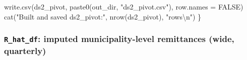 \documentclass[
  11pt,
  letterpaper,
  DIV=11,
  numbers=noendperiod]{scrartcl}
\newenvironment{Shaded}{}{}
\newcommand{\AttributeTok}[1]{\textcolor[rgb]{0.84,0.23,0.29}{#1}}
\newcommand{\ConstantTok}[1]{\textcolor[rgb]{0.00,0.36,0.77}{#1}}
\newcommand{\FunctionTok}[1]{\textcolor[rgb]{0.44,0.26,0.76}{#1}}
\newcommand{\NormalTok}[1]{\textcolor[rgb]{0.14,0.16,0.18}{#1}}
\newcommand{\SpecialCharTok}[1]{\textcolor[rgb]{0.00,0.36,0.77}{#1}}
\newcommand{\StringTok}[1]{\textcolor[rgb]{0.01,0.18,0.38}{#1}}
\begin{document}
\begin{Shaded}
\begin{Highlighting}[]
  \FunctionTok{write.csv}\NormalTok{(ds2\_pivot, }\FunctionTok{paste0}\NormalTok{(out\_dir, }\StringTok{"ds2\_pivot.csv"}\NormalTok{),}
            \AttributeTok{row.names =} \ConstantTok{FALSE}\NormalTok{)}
  \FunctionTok{cat}\NormalTok{(}\StringTok{"Built and saved ds2\_pivot:"}\NormalTok{, }\FunctionTok{nrow}\NormalTok{(ds2\_pivot), }\StringTok{"rows}\SpecialCharTok{\textbackslash{}n}\StringTok{"}\NormalTok{)}
\NormalTok{\}}
\end{Highlighting}
\end{Shaded}

\subsubsection{\texorpdfstring{\texttt{R\_hat\_df}: imputed
municipality-level remittances (wide,
quarterly)}{R\_hat\_df: imputed municipality-level remittances (wide, quarterly)}}\label{r_hat_df-imputed-municipality-level-remittances-wide-quarterly}
\end{document}
